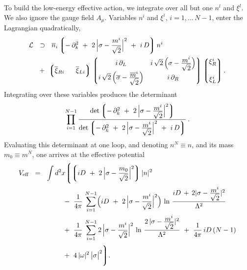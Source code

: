 \documentclass[12pt]{article}
\newcommand{\p}{\partial}
\newcommand{\ov}{\overline}
\newcommand{\mc}[1]{\mathcal{#1}}
\newcommand{\lgr}{\left\lgroup}
\newcommand{\rgr}{\right\rgroup}
\newcommand{\nbar}{\ov{n}}
\newcommand{\bxi}{\ov{\xi}{}}
\begin{document}
	To build the low-energy effective action, we integrate over all but one $ n^l $ and $ \xi^l $.
	We also ignore the gauge field $ A_\mu $.
	Variables $ n^i $ and $ \xi^i $, $ i = 1,...\, N-1 $, enter the Lagrangian quadratically,
\begin{align*}
%
	\mc{L} & ~~\supset~~ \nbar{}_i 
		   \lgr -\, \p_k^2 ~+~ 2\,\Bigl| \sigma - \frac{m^i}{\sqrt{2}} \Bigr|^2 ~+~  i\, D \rgr n^i
	\\
%
	&~ ~+~ \lgr \bxi_{Ri}~~~~~  \bxi_{Li} \rgr 
		\lgr \begin{matrix}
			i\,\p_L  &  
			i\,\sqrt{2}\, \Bigl(\sigma - \frac{\displaystyle m^i}{\displaystyle \sqrt{2}}\Bigr) \\
			i\,\sqrt{2}\,\Bigl(\ov{\sigma} - \frac{\displaystyle \ov{m}{}^i}{\displaystyle\sqrt{2}}\Bigr) &  
			i\,\p_R 
		     \end{matrix} \rgr
		\lgr \begin{matrix}
			\xi_R^i \\[5mm] \xi_L^i
		     \end{matrix} \rgr.
\end{align*}
	Integrating over these variables produces the determinant
\[
	\prod_{i=1}^{N-1}
	\frac{ \det \lgr -\,\p_k^2 ~+~ 
			2\,\Bigl| \sigma - \frac{\displaystyle m^i}{\displaystyle \sqrt{2}} \Bigr|^2 \rgr }
             { \det \lgr -\,\p_k^2 ~+~ 
			2\,\Bigl| \sigma - \frac{\displaystyle m^i}{\displaystyle \sqrt{2}} \Bigr|^2 ~+~ i\, D \rgr } \,.
\]
	Evaluating this determinant at one loop, and denoting $ n^N \equiv n $, and its mass
	$ m_0 \equiv m^N $, one arrives at the effective potential
\begin{align}
%
\notag
	V_\text{eff} & ~~=~~  \int d^2x 
		\Biggl\lgroup  \lgr iD ~+~ 2\,\Bigl|\sigma - \frac{m_0}{\sqrt{2}}\Bigr|^2 \rgr |n|^2 
	\\
%
\label{Veff}
	&\qquad\qquad\quad
	-~ 
	\frac{1}{4\pi}\, \sum_{i=1}^{N-1} \Bigl( iD ~+~ 2\,\Bigl|\sigma - \frac{m^i}{\sqrt{2}}\Bigr|^2 \Bigr)\,
		\ln\, \frac{ iD \,+\, 2 | \sigma - \frac{\displaystyle m^i}{\displaystyle \sqrt{2}} |^2} {\Lambda^2}
	\\
%
\notag
	&\qquad\qquad\quad
	+~
	\frac{1}{4\pi}\, \sum_{i=1}^{N-1} 2\,\Bigl|\sigma - \frac{m^i}{\sqrt{2}}\Bigr|^2\,
			\ln\, \frac{ 2\, | \sigma - \frac{\displaystyle m^i}{\displaystyle \sqrt{2}} |^2 } { \Lambda^2 }
	~+~ 
	\frac{1}{4\pi}\, iD\, (N-1) 
	\\[1mm]
%
\notag
	&\qquad\qquad\quad
	+~
	4\, |\omega|^2\,\bigl|\sigma\bigr|^2 \Biggr\rgroup.
\end{align}
\end{document}
